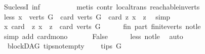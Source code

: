 \begin{isabellebody}
\ Suc{\isacharunderscore}{\kern0pt}lessI\ inf\isanewline
\ \ \ \ \ \ \ \ \isamarkupfalse%
\ {\isacharparenleft}{\kern0pt}metis\ contr\ local{\isachardot}{\kern0pt}trans\ reachable{}{\isacharunderscore}{\kern0pt}in{\isacharunderscore}{\kern0pt}verts{\isacharparenleft}{\kern0pt}{}{\isacharparenright}{\kern0pt}{\isacharparenright}{\kern0pt}\ \isanewline
\ \ \ \ \isamarkupfalse%
\isanewline
\ \ \isamarkupfalse%
\isanewline
\ \ \isamarkupfalse%
\ \isamarkupfalse%
\ less{\isacharcolon}{\kern0pt}\ {\isachardoublequoteopen}{\isasymexists}x\ {\isasymin}\ verts\ G{\isachardot}{\kern0pt}\ \ card\ {\isacharparenleft}{\kern0pt}verts\ G{\isacharparenright}{\kern0pt}\ {\isacharless}{\kern0pt}\ card\ {\isacharbraceleft}{\kern0pt}z{\isachardot}{\kern0pt}\ x\ {\isasymrightarrow}\isactrlsup {\isacharplus}{\kern0pt}\ z{\isacharbraceright}{\kern0pt}{\isachardoublequoteclose}\ \isamarkupfalse%
\ simp\isanewline
\ \ \isamarkupfalse%
\isanewline
\ \ \isamarkupfalse%
\ {\isachardoublequoteopen}{\isasymforall}x{\isachardot}{\kern0pt}\ card\ \ {\isacharbraceleft}{\kern0pt}z{\isachardot}{\kern0pt}\ x\ {\isasymrightarrow}\isactrlsup {\isacharplus}{\kern0pt}\ z{\isacharbraceright}{\kern0pt}\ {\isasymle}\ card\ {\isacharparenleft}{\kern0pt}verts\ G{\isacharparenright}{\kern0pt}{\isachardoublequoteclose}\isanewline
\ \ \ \ \isamarkupfalse%
\ fin\ part\ finite{\isacharunderscore}{\kern0pt}verts\ not{\isacharunderscore}{\kern0pt}le\isanewline
\ \ \ \ \isamarkupfalse%
\ {\isacharparenleft}{\kern0pt}simp\ add{\isacharcolon}{\kern0pt}\ card{\isacharunderscore}{\kern0pt}mono{\isacharparenright}{\kern0pt}\ \isanewline
\ \ \isamarkupfalse%
\ \isamarkupfalse%
\ False\isanewline
\ \ \ \ \isamarkupfalse%
\ less\ not{\isacharunderscore}{\kern0pt}le\ \isamarkupfalse%
\ auto\isanewline
{}\isamarkupfalse%
%
\endisatagproof
{\isafoldproof}%
%
\isadelimproof
\isanewline
%
\endisadelimproof
\isanewline
{}\isamarkupfalse%
\ {\isacharparenleft}{\kern0pt}\ blockDAG{\isacharparenright}{\kern0pt}\ tips{\isacharunderscore}{\kern0pt}not{\isacharunderscore}{\kern0pt}empty{\isacharcolon}{\kern0pt}\ \isanewline
\ \ \ {\isachardoublequoteopen}tips\ G\ {\isasymnoteq}\ {\isacharbraceleft}{\kern0pt}{\isacharbraceright}{\kern0pt}{\isachardoublequoteclose}\ \isanewline
%
\isadelimproof
%
\endisadelimproof
%

\end{isabellebody}
